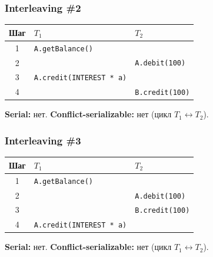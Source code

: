 \documentclass{beamer}
\begin{document}
\begin{frame}
\frametitle{Interleaving \#2}

\vspace{0.5em}
\normalsize
\begin{center}
\begin{tabular}{c|p{}|p{}}
\textbf{Шаг} & \textbf{$T_1$} & \textbf{$T_2$} \\ \hline
1 & \texttt{A.getBalance()} &  \\
2 &  & \texttt{A.debit(100)} \\
3 & \texttt{A.credit(INTEREST * a)} &  \\
4 &  & \texttt{B.credit(100)} \\
\end{tabular}
\end{center}

\vspace{0.4em}
\pause
\textbf{Serial:} нет. \quad
\pause
\textbf{Conflict-serializable:} нет (цикл $T_1 \leftrightarrow T_2$).

\end{frame}

\begin{frame}
\frametitle{Interleaving \#3}

\vspace{0.5em}
\normalsize
\begin{center}
\begin{tabular}{c|p{}|p{}}
\textbf{Шаг} & \textbf{$T_1$} & \textbf{$T_2$} \\ \hline
1 & \texttt{A.getBalance()} &  \\
2 &  & \texttt{A.debit(100)} \\
3 &  & \texttt{B.credit(100)} \\
4 & \texttt{A.credit(INTEREST * a)} &  \\
\end{tabular}
\end{center}

\vspace{0.4em}
\pause
\textbf{Serial:} нет. \quad
\pause
\textbf{Conflict-serializable:} нет (цикл $T_1 \leftrightarrow T_2$).

\end{frame}
\end{document}
